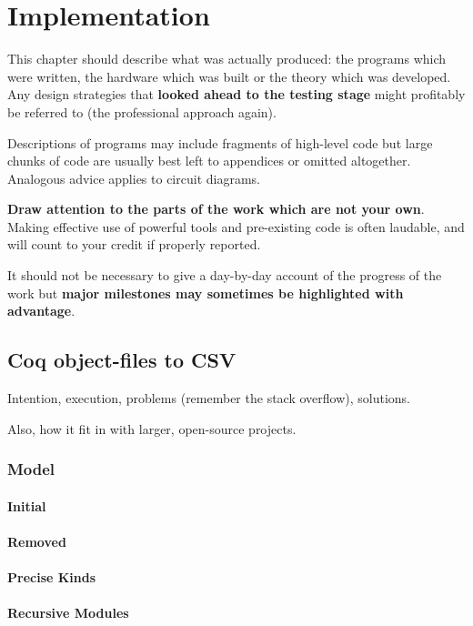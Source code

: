 \chapter{Implementation}

{\sf \color{red}
  This chapter should describe what was actually produced: the programs which
  were written, the hardware which was built or the theory which was developed.
  Any design strategies that \textbf{looked ahead to the testing stage} might profitably
  be referred to (the professional approach again). 

  Descriptions of programs may include fragments of high-level code but large
  chunks of code are usually best left to appendices or omitted altogether.
  Analogous advice applies to circuit diagrams. 

  \textbf{Draw attention to the parts of the work which are not your own}. Making
  effective use of powerful tools and pre-existing code is often laudable, and
  will count to your credit if properly reported. 

  It should not be necessary to give a day-by-day account of the progress of the
  work but \textbf{major milestones may sometimes be highlighted with advantage}.
}

\section{Coq object-files to CSV}
Intention, execution, problems (remember the stack overflow), solutions.

Also, how it fit in with larger, open-source projects.

\subsection{Model}

\subsubsection{Initial}

\subsubsection{Removed}

\subsubsection{Precise Kinds}

\subsubsection{Recursive Modules}

